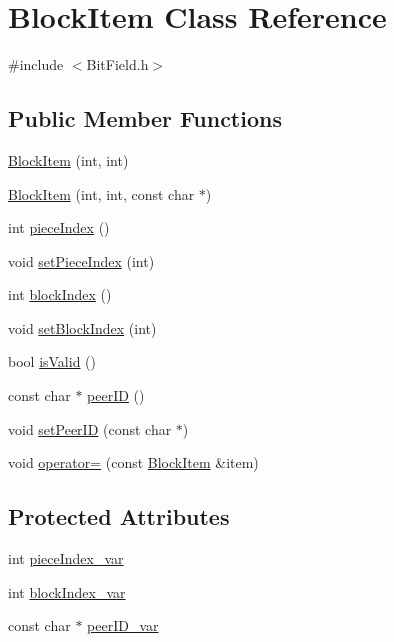 \hypertarget{classBlockItem}{}\section{Block\+Item Class Reference}
\label{classBlockItem}


{\ttfamily \#include $<$Bit\+Field.\+h$>$}

\subsection*{Public Member Functions}
\begin{DoxyCompactItemize}
\item 
\hyperlink{classBlockItem_a0b7a15af5e4403628abf890668c391d5}{Block\+Item} (int, int)
\item 
\hyperlink{classBlockItem_a0af716091cdf8981f4fd25546a3d3e73}{Block\+Item} (int, int, const char $\ast$)
\item 
int \hyperlink{classBlockItem_a5ca6f396358bcdcb7ebc5e760eaa6349}{piece\+Index} ()
\item 
void \hyperlink{classBlockItem_a03d4546eebea115c6c9959a58e7a3aad}{set\+Piece\+Index} (int)
\item 
int \hyperlink{classBlockItem_ad93b44e66ac71d850a615a75eec02b36}{block\+Index} ()
\item 
void \hyperlink{classBlockItem_a55337c428ce2cebe921bcd82e3c9a084}{set\+Block\+Index} (int)
\item 
bool \hyperlink{classBlockItem_a6eeb6bee4029085b837cb97f2dc49483}{is\+Valid} ()
\item 
const char $\ast$ \hyperlink{classBlockItem_a954c023a1398d22f8b5cc38ef755ab28}{peer\+I\+D} ()
\item 
void \hyperlink{classBlockItem_abad1c5c7788e70d51195930c48d548be}{set\+Peer\+I\+D} (const char $\ast$)
\item 
void \hyperlink{classBlockItem_a187c41f36766a33d7bee6e7b1e8ede9e}{operator=} (const \hyperlink{classBlockItem}{Block\+Item} \&item)
\end{DoxyCompactItemize}
\subsection*{Protected Attributes}
\begin{DoxyCompactItemize}
\item 
int \hyperlink{classBlockItem_a4a22399d8eb07f3adc99d570bbe233e3}{piece\+Index\+\_\+var}
\item 
int \hyperlink{classBlockItem_aec1543f62a708d51a44741193e535091}{block\+Index\+\_\+var}
\item 
const char $\ast$ \hyperlink{classBlockItem_a2a9222fa374e21edf58c574f402de26a}{peer\+I\+D\+\_\+var}
\end{DoxyCompactItemize}


